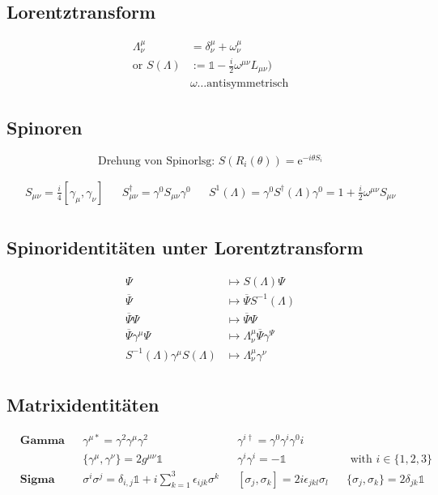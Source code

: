 \documentclass[10pt,a4paper,notitlepage]{scrartcl}
\begin{document}
\subsection*{Lorentztransform}

\begin{align*}
    \Lambda^\mu_\nu &= \delta^\mu_\nu + \omega^\mu_\nu\\
    \text{or } S(\Lambda) &:=  \mathbb{1} - \frac{i}{2} \omega^{\mu\nu}L_{\mu\nu})\\
    &\omega \ldots \text{antisymmetrisch}
\end{align*}

\subsection*{Spinoren}

\begin{equation}
    \text{Drehung von Spinorlsg:   } S(R_i(\theta)) = \text{e}^{-i\theta S_i}
\end{equation}

\begin{align*} 
    S_{\mu\nu} = \frac{i}{4}[\gamma_\mu, \gamma_\nu] &&
    S^\dagger_{\mu\nu} = \gamma^0 S_{\mu\nu}\gamma^0 &&
    S^1(\Lambda)=\gamma^0 S^\dagger(\Lambda)\gamma^0 = 1 + \frac{i}{2}\omega^{\mu\nu} S_{\mu\nu}\\
\end{align*}

\subsection*{Spinoridentitäten unter Lorentztransform}
\begin{align*}
    \Psi &\mapsto S(\Lambda) \Psi\\
    \overline{\Psi} &\mapsto \overline{\Psi}S^{-1}(\Lambda)\\
    \overline{\Psi}\Psi &\mapsto \overline{\Psi}\Psi\\
    \overline{\Psi}\gamma^\mu\Psi &\mapsto \Lambda^\mu_\nu \overline{\Psi}\gamma^\Psi\\
    S^{-1}(\Lambda)\gamma^\mu S(\Lambda) &\mapsto \Lambda^\mu_\nu \gamma^\nu\\
\end{align*}

\subsection*{Matrixidentitäten}
\begin{align*}
    &\textbf{Gamma}&&\gamma^{\mu\ast} = \gamma^2\gamma^\mu\gamma^2 && \gamma^{i\dagger} = \gamma^0\gamma^i\gamma^0i \\
    &&&\{\gamma^\mu, \gamma^\nu\} = 2 g^{\mu\nu}\mathbb{1} &&\gamma^i\gamma^i = - \mathbb{1}
    &&\text{ with } i \in \{1,2,3\} \\    
    &\textbf{Sigma}&&\sigma^i\sigma^j = \delta_{i,j}\mathbb{1} + i \sum_{k=1}^3 \epsilon_{ijk}\sigma^k &&
    [\sigma_j, \sigma_k] = 2i\epsilon_{jkl}\sigma_l &&
    \{\sigma_j, \sigma_k\} = 2 \delta_{jk} \mathbb{1}\\
\end{align*}
\end{document}
